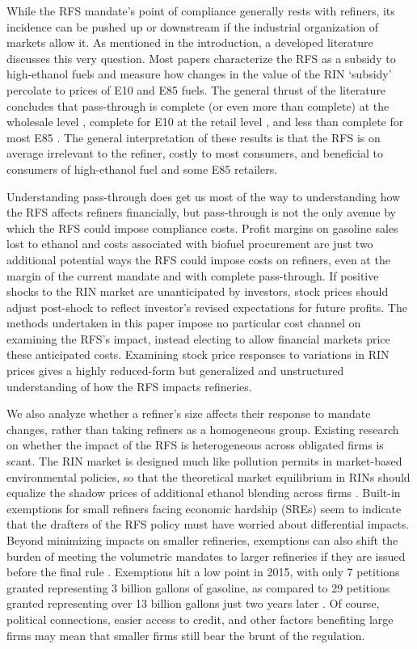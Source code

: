 \documentclass[11pt]{article}
\begin{document}
While the RFS mandate's point of compliance generally rests with refiners, its incidence can be pushed up or downstream if the industrial organization of markets allow it. As mentioned in the introduction, a developed literature discusses this very question. Most papers characterize the RFS as a subsidy to high-ethanol fuels and measure how changes in the value of the RIN `subsidy' percolate to prices of E10 and E85 fuels. The general thrust of the literature concludes that pass-through is complete (or even more than complete) at the wholesale level \citep{Knittel2017,Burkhardt2019,Lade2019}, complete for E10 at the retail level \citep{Pouliot2017,Lade2019,Li2019}, and less than complete for most E85 \citep{Lade2019,Li2019}. The general interpretation of these results is that the RFS is on average irrelevant to the refiner, costly to most consumers, and beneficial to consumers of high-ethanol fuel and some E85 retailers.

Understanding pass-through does get us most of the way to understanding how the RFS affects refiners financially, but pass-through is not the only avenue by which the RFS could impose compliance costs. Profit margins on gasoline sales lost to ethanol and costs associated with biofuel procurement are just two additional potential ways the RFS could impose costs on refiners, even at the margin of the current mandate and with complete pass-through. If positive shocks to the RIN market are unanticipated by investors, stock prices should adjust post-shock to reflect investor's revised expectations for future profits. The methods undertaken in this paper impose no particular cost channel on examining the RFS's impact, instead electing to allow financial markets price these anticipated costs. Examining stock price responses to variations in RIN prices gives a highly reduced-form but generalized and unstructured understanding of how the RFS impacts refineries. 

We also analyze whether a refiner's size affects their response to mandate changes, rather than taking refiners as a homogeneous group. Existing research on whether the impact of the RFS is heterogeneous across obligated firms is scant. The RIN market is designed much like pollution permits in market-based environmental policies, so that the theoretical market equilibrium in RINs should equalize the shadow prices of additional ethanol blending across firms \citep{Montgomery1972}. Built-in exemptions for small refiners facing economic hardship (SREs) seem to indicate that the drafters of the RFS policy must have worried about differential impacts. Beyond minimizing impacts on smaller refineries, exemptions can also shift the burden of meeting the volumetric mandates to larger refineries if they are issued before the final rule \citep{Coppess2017}. Exemptions hit a low point in 2015, with only 7 petitions granted representing 3 billion gallons of gasoline, as compared to 29 petitions granted representing over 13 billion gallons just two years later \citep{EnvironmentalProtectionAgency2018}. Of course, political connections, easier access to credit, and other factors benefiting large firms may mean that smaller firms still bear the brunt of the regulation. 
\end{document}

